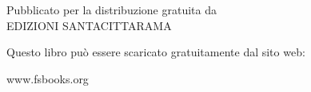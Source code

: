 \cleartorecto
\thispagestyle{empty}

{\raggedleft
\firaSansLightFont
\color[gray]{0.35}%

\vspace*{4\baselineskip}
\setlength{\parskip}{1em}
\setlength{\parindent}{0pt}

{\fontsize{22}{25}\selectfont
\color[gray]{0.3}%
\MakeUppercase{\thetitle}}

\vspace*{0.9\baselineskip}

{\fontsize{12}{15}\selectfont
\theauthor}

\vfill

Pubblicato per la distribuzione gratuita da\\
EDIZIONI SANTACITTARAMA

Questo libro può essere scaricato gratuitamente dal sito web:

\vspace*{-0.8\baselineskip}%
{\fontsize{10}{12}\selectfont
www.fsbooks.org}%

}

